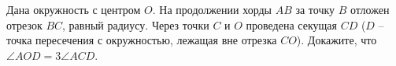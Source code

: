 \begin{ex}[type=none]
	\begin{condition}
		Дана окружность с центром \( O \). На продолжении хорды \( AB  \) за точку \( B  \) отложен отрезок \( BC \), равный радиусу. Через точки \( C  \) и \( O  \) проведена секущая \( CD  \) (\( D \) – точка пересечения с окружностью, лежащая вне отрезка \( CO \)). Докажите, что \( \angle AOD = 3\angle ACD \).
	\end{condition}
	\answer{ }
\end{ex}